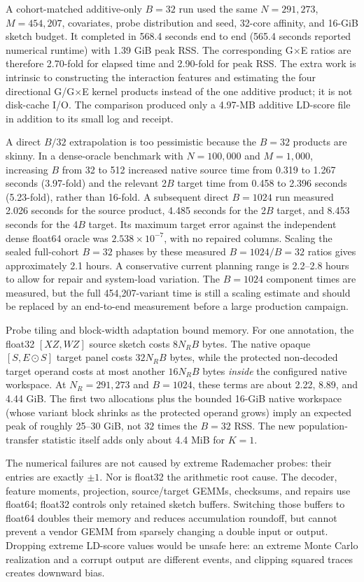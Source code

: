 \documentclass[11pt]{article}
\begin{document}
A cohort-matched additive-only $B=32$ run used the same $N=291{,}273$,
$M=454{,}207$, covariates, probe distribution and seed, 32-core affinity, and
16-GiB sketch budget.  It completed in 568.4 seconds end to end (565.4 seconds
reported numerical runtime) with 1.39 GiB peak RSS.  The corresponding G$\times$E
ratios are therefore 2.70-fold for elapsed time and 2.90-fold for peak RSS.
The extra work is intrinsic to constructing the interaction features and
estimating the four directional G/G$\times$E kernel products instead of the one
additive product; it is not disk-cache I/O.  The comparison produced only a
4.97-MB additive LD-score file in addition to its small log and receipt.

A direct $B/32$ extrapolation is too pessimistic because the $B=32$ products
are skinny.  In a dense-oracle benchmark with $N=100{,}000$ and $M=1{,}000$,
increasing $B$ from 32 to 512 increased native source time from 0.319 to 1.267
seconds (3.97-fold) and the relevant 2$B$ target time from 0.458 to 2.396
seconds (5.23-fold), rather than 16-fold.  A subsequent direct $B=1024$ run
measured 2.026 seconds for the source product, 4.485 seconds for the 2$B$
target, and 8.453 seconds for the 4$B$ target.  Its maximum target error against
the independent dense float64 oracle was $2.538\times10^{-7}$, with no repaired
columns.  Scaling the sealed full-cohort $B=32$ phases by these measured
$B=1024/B=32$ ratios gives approximately 2.1 hours.  A conservative current
planning range is 2.2--2.8 hours to allow for repair and system-load variation.
The $B=1024$ component times are measured, but the full 454,207-variant time is
still a scaling estimate and should be replaced by an end-to-end measurement
before a large production campaign.

Probe tiling and block-width adaptation bound memory.  For one annotation, the
float32 $[XZ,WZ]$ source sketch costs $8N_RB$ bytes.  The native opaque
$[S,E\odot S]$ target panel costs $32N_RB$ bytes, while the protected
non-decoded target operand costs at most another $16N_RB$ bytes \emph{inside}
the configured native workspace.  At $N_R=291{,}273$ and $B=1024$, these terms
are about 2.22, 8.89, and 4.44 GiB.  The first two allocations plus the bounded
16-GiB native workspace (whose variant block shrinks as the protected operand
grows) imply an expected peak of roughly 25--30 GiB, not $32$ times the $B=32$
RSS.  The new population-transfer statistic itself adds only about 4.4 MiB for
$K=1$.

The numerical failures are not caused by extreme Rademacher probes: their
entries are exactly $\pm1$.  Nor is float32 the arithmetic root cause.  The
decoder, feature moments, projection, source/target GEMMs, checksums, and
repairs use float64; float32 controls only retained sketch buffers.  Switching
those buffers to float64 doubles their memory and reduces accumulation
roundoff, but cannot prevent a vendor GEMM from sparsely changing a double
input or output.  Dropping extreme LD-score values would be unsafe here: an
extreme Monte Carlo realization and a corrupt output are different events,
and clipping squared traces creates downward bias.
\end{document}
